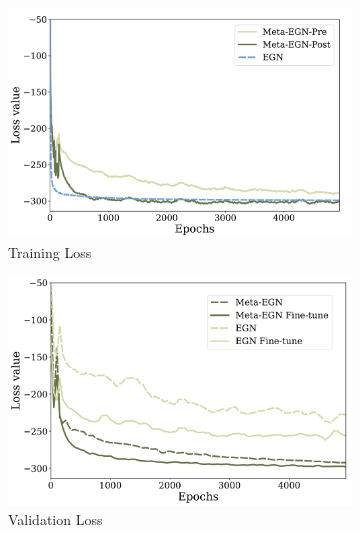 \begin{figure}[t]
     \centering
     \vspace{-1mm}
     \begin{subfigure}[c]{0.32\textwidth}
         \centering
         \includegraphics[width=\textwidth]{iclr2023/img/method/training_loss.pdf}
         \vspace{-0.6cm}
         \caption{Training Loss}
         \label{fig:dynamic_1}
     \end{subfigure}
     \hfill
     \begin{subfigure}[c]{0.32\textwidth}
         \centering
         \includegraphics[width=\textwidth]{iclr2023/img/method/val_loss.pdf}
         \vspace{-0.6cm}
         \caption{Validation Loss}
         \label{method:fig_dynamic_2}
     \end{subfigure}
     \hfill
     \begin{subfigure}[c]{0.32\textwidth}

\end{subfigure}
\end{figure}
